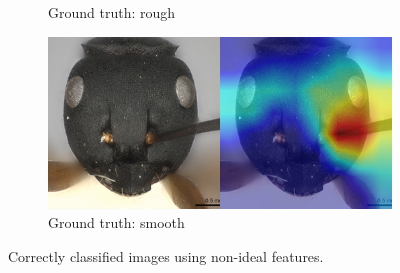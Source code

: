 \documentclass{aci}
\numberwithin{equation}{section}
\begin{document}
\begin{figure}
\begin{subfigure}{\subwidth}
        \caption{Ground truth: rough}
        \label{fig:correct_nonideal_1694}
    \end{subfigure}
    \begin{subfigure}{\subwidth}
        \includegraphics[width=1\linewidth]{thesis_assets/gradcam/correct_nonideal/388.png}
        \caption{Ground truth: smooth}
        \label{fig:correct_nonideal_388}
    \end{subfigure}
    \caption{Correctly classified images using non-ideal features.}
    \label{fig:correct_nonideal}
\end{figure}
\end{document}
